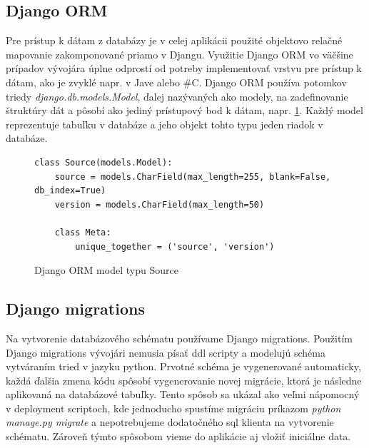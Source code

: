\subsection{Django ORM}
Pre prístup k dátam z databázy je v celej aplikácii použité objektovo relačné mapovanie zakomponované priamo v Djangu. Využitie Django ORM vo väčšine prípadov vývojára úplne odprostí od potreby implementovať vrstvu pre prístup k dátam, ako je zvyklé napr. v Jave alebo \#C. Django ORM používa potomkov triedy \emph{django.db.models.Model}, ďalej nazývaných ako modely, na zadefinovanie štruktúry dát a pôsobí ako jediný prístupový bod k dátam, napr. \ref{fig:django-model}. Každý model reprezentuje tabuľku v databáze a jeho objekt tohto typu jeden riadok v databáze. 

\begin{figure}[htbp]
\centering
\begin{minipage}{0.9\textwidth}
\lstset{columns=flexible,breaklines=true,breakatwhitespace=true, showstringspaces=false}
\begin{lstlisting}
class Source(models.Model):
    source = models.CharField(max_length=255, blank=False, db_index=True)
    version = models.CharField(max_length=50)

    class Meta:
        unique_together = ('source', 'version')
\end{lstlisting} 		
\end{minipage} 
\caption{Django ORM model typu Source}
\label{fig:django-model}
\end{figure}

\subsection{Django migrations}
Na vytvorenie databázového schématu používame Django migrations. Použitím Django migrations vývojári nemusia písať ddl scripty a modelujú schéma vytváraním tried v jazyku python. Prvotné schéma je vygenerované automaticky, každá ďalšia zmena kódu spôsobí vygenerovanie novej migrácie, ktorá je následne aplikovaná na databázové tabuľky. Tento spôsob sa ukázal ako veľmi nápomocný v deployment scriptoch, kde jednoducho spustíme migráciu príkazom \emph{python manage.py migrate} a nepotrebujeme dodatočného sql klienta na vytvorenie schématu. Zároveň týmto spôsobom vieme do aplikácie aj vložiť iniciálne data.

